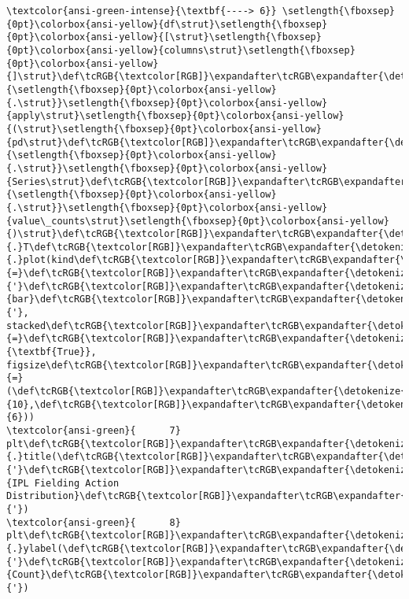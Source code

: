 \documentclass[11pt]{article}
\begin{document}
\begin{Verbatim}[commandchars=\\\{\}, frame=single, framerule=2mm, rulecolor=\color{outerrorbackground}]
\textcolor{ansi-green-intense}{\textbf{----> 6}} \setlength{\fboxsep}{0pt}\colorbox{ansi-yellow}{df\strut}\setlength{\fboxsep}{0pt}\colorbox{ansi-yellow}{[\strut}\setlength{\fboxsep}{0pt}\colorbox{ansi-yellow}{columns\strut}\setlength{\fboxsep}{0pt}\colorbox{ansi-yellow}{]\strut}\def\tcRGB{\textcolor[RGB]}\expandafter\tcRGB\expandafter{\detokenize{98,98,98}}{\setlength{\fboxsep}{0pt}\colorbox{ansi-yellow}{.\strut}}\setlength{\fboxsep}{0pt}\colorbox{ansi-yellow}{apply\strut}\setlength{\fboxsep}{0pt}\colorbox{ansi-yellow}{(\strut}\setlength{\fboxsep}{0pt}\colorbox{ansi-yellow}{pd\strut}\def\tcRGB{\textcolor[RGB]}\expandafter\tcRGB\expandafter{\detokenize{98,98,98}}{\setlength{\fboxsep}{0pt}\colorbox{ansi-yellow}{.\strut}}\setlength{\fboxsep}{0pt}\colorbox{ansi-yellow}{Series\strut}\def\tcRGB{\textcolor[RGB]}\expandafter\tcRGB\expandafter{\detokenize{98,98,98}}{\setlength{\fboxsep}{0pt}\colorbox{ansi-yellow}{.\strut}}\setlength{\fboxsep}{0pt}\colorbox{ansi-yellow}{value\_counts\strut}\setlength{\fboxsep}{0pt}\colorbox{ansi-yellow}{)\strut}\def\tcRGB{\textcolor[RGB]}\expandafter\tcRGB\expandafter{\detokenize{98,98,98}}{.}T\def\tcRGB{\textcolor[RGB]}\expandafter\tcRGB\expandafter{\detokenize{98,98,98}}{.}plot(kind\def\tcRGB{\textcolor[RGB]}\expandafter\tcRGB\expandafter{\detokenize{98,98,98}}{=}\def\tcRGB{\textcolor[RGB]}\expandafter\tcRGB\expandafter{\detokenize{175,0,0}}{'}\def\tcRGB{\textcolor[RGB]}\expandafter\tcRGB\expandafter{\detokenize{175,0,0}}{bar}\def\tcRGB{\textcolor[RGB]}\expandafter\tcRGB\expandafter{\detokenize{175,0,0}}{'}, stacked\def\tcRGB{\textcolor[RGB]}\expandafter\tcRGB\expandafter{\detokenize{98,98,98}}{=}\def\tcRGB{\textcolor[RGB]}\expandafter\tcRGB\expandafter{\detokenize{0,135,0}}{\textbf{True}}, figsize\def\tcRGB{\textcolor[RGB]}\expandafter\tcRGB\expandafter{\detokenize{98,98,98}}{=}(\def\tcRGB{\textcolor[RGB]}\expandafter\tcRGB\expandafter{\detokenize{98,98,98}}{10},\def\tcRGB{\textcolor[RGB]}\expandafter\tcRGB\expandafter{\detokenize{98,98,98}}{6}))
\textcolor{ansi-green}{      7} plt\def\tcRGB{\textcolor[RGB]}\expandafter\tcRGB\expandafter{\detokenize{98,98,98}}{.}title(\def\tcRGB{\textcolor[RGB]}\expandafter\tcRGB\expandafter{\detokenize{175,0,0}}{'}\def\tcRGB{\textcolor[RGB]}\expandafter\tcRGB\expandafter{\detokenize{175,0,0}}{IPL Fielding Action Distribution}\def\tcRGB{\textcolor[RGB]}\expandafter\tcRGB\expandafter{\detokenize{175,0,0}}{'})
\textcolor{ansi-green}{      8} plt\def\tcRGB{\textcolor[RGB]}\expandafter\tcRGB\expandafter{\detokenize{98,98,98}}{.}ylabel(\def\tcRGB{\textcolor[RGB]}\expandafter\tcRGB\expandafter{\detokenize{175,0,0}}{'}\def\tcRGB{\textcolor[RGB]}\expandafter\tcRGB\expandafter{\detokenize{175,0,0}}{Count}\def\tcRGB{\textcolor[RGB]}\expandafter\tcRGB\expandafter{\detokenize{175,0,0}}{'})


\end{Verbatim}
\end{document}
